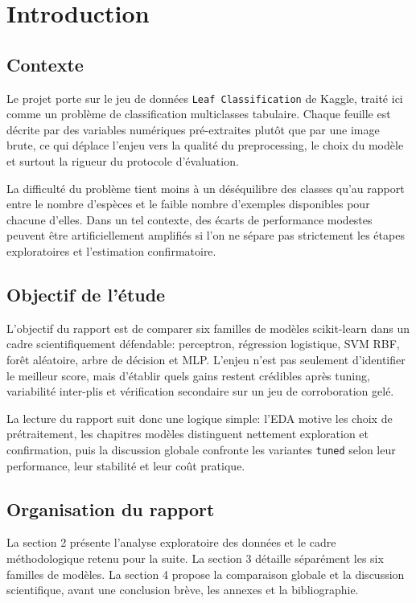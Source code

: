 \section{Introduction}

\subsection{Contexte}
Le projet porte sur le jeu de données \texttt{Leaf Classification} de Kaggle, traité ici comme un problème de classification multiclasses tabulaire. Chaque feuille est décrite par des variables numériques pré-extraites plutôt que par une image brute, ce qui déplace l'enjeu vers la qualité du preprocessing, le choix du modèle et surtout la rigueur du protocole d'évaluation.

La difficulté du problème tient moins à un déséquilibre des classes qu'au rapport entre le nombre d'espèces et le faible nombre d'exemples disponibles pour chacune d'elles. Dans un tel contexte, des écarts de performance modestes peuvent être artificiellement amplifiés si l'on ne sépare pas strictement les étapes exploratoires et l'estimation confirmatoire.

\subsection{Objectif de l'étude}
L'objectif du rapport est de comparer six familles de modèles scikit-learn dans un cadre scientifiquement défendable: perceptron, régression logistique, SVM RBF, forêt aléatoire, arbre de décision et MLP. L'enjeu n'est pas seulement d'identifier le meilleur score, mais d'établir quels gains restent crédibles après tuning, variabilité inter-plis et vérification secondaire sur un jeu de corroboration gelé.

La lecture du rapport suit donc une logique simple: l'EDA motive les choix de prétraitement, les chapitres modèles distinguent nettement exploration et confirmation, puis la discussion globale confronte les variantes \texttt{tuned} selon leur performance, leur stabilité et leur coût pratique.

\subsection{Organisation du rapport}
La section 2 présente l'analyse exploratoire des données et le cadre méthodologique retenu pour la suite. La section 3 détaille séparément les six familles de modèles. La section 4 propose la comparaison globale et la discussion scientifique, avant une conclusion brève, les annexes et la bibliographie.


